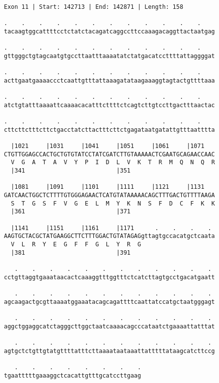\documentclass{article}
\begin{document}
\begin{Verbatim}
Exon 11 | Start: 142713 | End: 142871 | Length: 158
 
.    .    .    .    .    .    .    .    .    .    .    .    
tacaagtggcattttcctctatctacagatcaggccttccaaagacaggttactaatgag
  
.    .    .    .    .    .    .    .    .    .    .    .    
gttgggctgtagcaatgtgccttaatttaaaatatctatgacatccttttattaggggat
  
.    .    .    .    .    .    .    .    .    .    .    .    
acttgaatgaaaaccctcaattgtttattaaagatataagaaaggtagtactgttttaaa
  
.    .    .    .    .    .    .    .    .    .    .    .    
atctgtatttaaaattcaaaacacatttcttttctcagtcttgtccttgactttaactac
  
.    .    .    .    .    .    .    .    .    .    .    .    
cttcttctttcttctgacctatcttactttcttctgagataatgatattgtttaatttta
  
  |1021     |1031     |1041     |1051     |1061     |1071   
CTGTTGGAGCCACTGCTGTGTATCCTATCGATCTTGTAAAAACTCGAATGCAGAACCAAC
  V  G  A  T  A  V  Y  P  I  D  L  V  K  T  R  M  Q  N  Q  R
  |341                          |351                        
  
  |1081     |1091     |1101     |1111     |1121     |1131   
GATCAACTGGCTCTTTTGTGGGAGAACTCATGTATAAAAACAGCTTTGACTGTTTTAAGA
  S  T  G  S  F  V  G  E  L  M  Y  K  N  S  F  D  C  F  K  K
  |361                          |371                        
  
  |1141     |1151     |1161     |1171      .    .    .    . 
AAGTGCTACGCTATGAAGGCTTCTTTGGACTGTATAGAGgttagtgccacatgctcaata
  V  L  R  Y  E  G  F  F  G  L  Y  R  G                     
  |381                          |391                        
  
   .    .    .    .    .    .    .    .    .    .    .    . 
cctgttaggtgaaataacactcaaaggtttggtttctcatcttagtgcctgacatgaatt
  
   .    .    .    .    .    .    .    .    .    .    .    . 
agcaagactgcgttaaaatggaaatacagcagattttcaattatccatgctaatgggagt
  
   .    .    .    .    .    .    .    .    .    .    .    . 
aggctggaggcatctagggcttggctaatcaaaacagcccataatctgaaaattatttat
  
   .    .    .    .    .    .    .    .    .    .    .    . 
agtgctctgttgtatgttttatttcttaaaataataaattatttttataagcatcttccg
  
   .    .    .    .    .    .    .    .
tgaatttttgaaaggctcacattgtttgcatccttgaag
\end{Verbatim}
\end{document}
